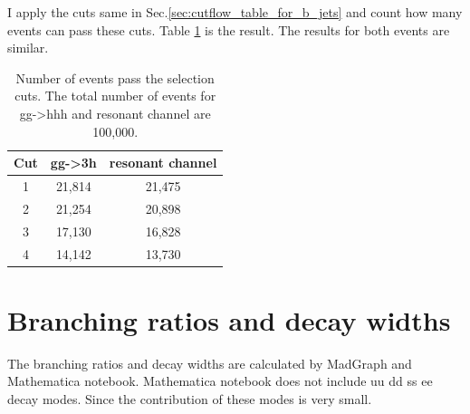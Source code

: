 \documentclass[12pt]{article}
\begin{document}
	I apply the cuts same in Sec.\ref{sec:cutflow_table_for_b_jets} and count how many events can pass these cuts. Table \ref{tab:cutflow_table_signal_and_resonant_bjet} is the result. The results for both events are similar.
	\begin{table}[htpb]
		\centering
		\caption{Number of events pass the selection cuts. The total number of events for gg->hhh and resonant channel are 100,000.}
		\label{tab:cutflow_table_signal_and_resonant_bjet}
		\begin{tabular}{ccc}
			Cut &  gg->3h & resonant channel \\
			\hline
			1 & 21,814 & 21,475\\
			2 & 21,254 & 20,898\\
			3 & 17,130 & 16,828\\
			4 & 14,142 & 13,730
		\end{tabular}	
	\end{table}

\section{Branching ratios and decay widths}%
\label{sec:branching_ratios_and_decay_widths}
	The branching ratios and decay widths are calculated by MadGraph and Mathematica notebook. Mathematica notebook does not include uu dd ss ee decay modes. Since the contribution of these modes is very small. 
\end{document}
